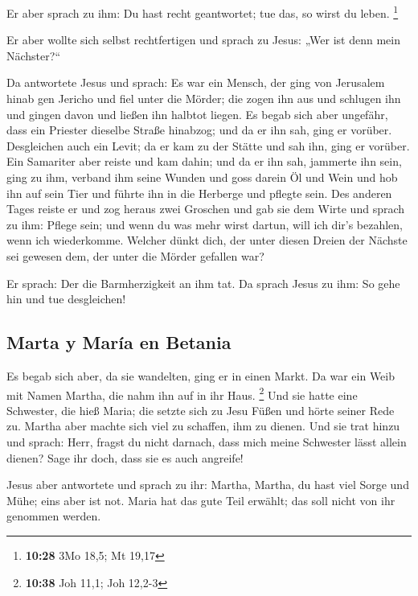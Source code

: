  Er aber sprach zu ihm: Du hast recht geantwortet; tue
das, so wirst du leben. \footnote{\textbf{10:28} 3Mo 18,5; Mt 19,17}

 Er aber wollte sich selbst rechtfertigen und sprach zu
Jesus: „Wer ist denn mein Nächster?{}``

 Da antwortete Jesus und sprach: Es war ein Mensch, der
ging von Jerusalem hinab gen Jericho und fiel unter die Mörder; die
zogen ihn aus und schlugen ihn und gingen davon und ließen ihn halbtot
liegen.  Es begab sich aber ungefähr, dass ein Priester
dieselbe Straße hinabzog; und da er ihn sah, ging er vorüber.
 Desgleichen auch ein Levit; da er kam zu der Stätte und
sah ihn, ging er vorüber.  Ein Samariter aber reiste und
kam dahin; und da er ihn sah, jammerte ihn sein,  ging zu
ihm, verband ihm seine Wunden und goss darein Öl und Wein und hob ihn
auf sein Tier und führte ihn in die Herberge und pflegte sein.
 Des anderen Tages reiste er und zog heraus zwei Groschen
und gab sie dem Wirte und sprach zu ihm: Pflege sein; und wenn du was
mehr wirst dartun, will ich dir's bezahlen, wenn ich wiederkomme.
 Welcher dünkt dich, der unter diesen Dreien der Nächste
sei gewesen dem, der unter die Mörder gefallen war?

 Er sprach: Der die Barmherzigkeit an ihm tat. Da sprach
Jesus zu ihm: So gehe hin und tue desgleichen!

\hypertarget{marta-y-maruxeda-en-betania}{%
\subsection{Marta y María en
Betania}\label{marta-y-maruxeda-en-betania}}

 Es begab sich aber, da sie wandelten, ging er in einen
Markt. Da war ein Weib mit Namen Martha, die nahm ihn auf in ihr Haus.
\footnote{\textbf{10:38} Joh 11,1; Joh 12,2-3}  Und sie
hatte eine Schwester, die hieß Maria; die setzte sich zu Jesu Füßen und
hörte seiner Rede zu.  Martha aber machte sich viel zu
schaffen, ihm zu dienen. Und sie trat hinzu und sprach: Herr, fragst du
nicht darnach, dass mich meine Schwester lässt allein dienen? Sage ihr
doch, dass sie es auch angreife!

 Jesus aber antwortete und sprach zu ihr: Martha, Martha,
du hast viel Sorge und Mühe;  eins aber ist not. Maria
hat das gute Teil erwählt; das soll nicht von ihr genommen werden.

